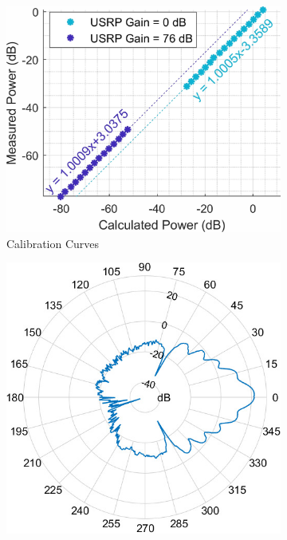 \documentclass[12pt, draftcls, onecolumn]{IEEEtran}
\begin{document}
\begin{figure} [t]
     \centering
     \begin{subfigure}{0.358\linewidth}
         \centering
         \includegraphics[width=1.0\linewidth]{figs/calibration.jpg}
         \caption{Calibration Curves}
         \label{F4a}
     \end{subfigure}
     \begin{subfigure}{0.31\linewidth}
         \centering
         \includegraphics[width=1.0\linewidth]{figs/antenna_azimuth.jpg}

\end{subfigure}
\end{figure}
\end{document}
